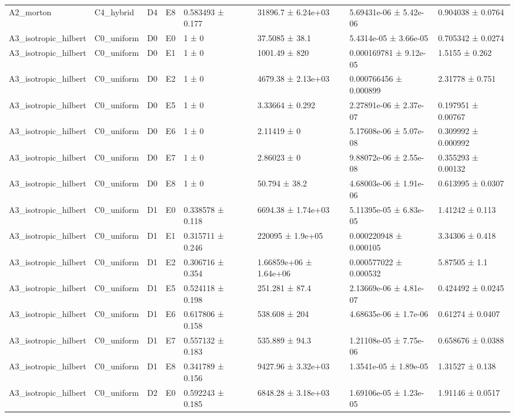 \begin{table}
\begin{tabular}{lllllllll}
A2\_morton & C4\_hybrid & D4 & E8 & 0.583493 ± 0.177 &  & 31896.7 ± 6.24e+03 & 5.69431e-06 ± 5.42e-06 & 0.904038 ± 0.0764 \\
A3\_isotropic\_hilbert & C0\_uniform & D0 & E0 & 1 ± 0 &  & 37.5085 ± 38.1 & 5.4314e-05 ± 3.66e-05 & 0.705342 ± 0.0274 \\
A3\_isotropic\_hilbert & C0\_uniform & D0 & E1 & 1 ± 0 &  & 1001.49 ± 820 & 0.000169781 ± 9.12e-05 & 1.5155 ± 0.262 \\
A3\_isotropic\_hilbert & C0\_uniform & D0 & E2 & 1 ± 0 &  & 4679.38 ± 2.13e+03 & 0.000766456 ± 0.000899 & 2.31778 ± 0.751 \\
A3\_isotropic\_hilbert & C0\_uniform & D0 & E5 & 1 ± 0 &  & 3.33664 ± 0.292 & 2.27891e-06 ± 2.37e-07 & 0.197951 ± 0.00767 \\
A3\_isotropic\_hilbert & C0\_uniform & D0 & E6 & 1 ± 0 &  & 2.11419 ± 0 & 5.17608e-06 ± 5.07e-08 & 0.309992 ± 0.000992 \\
A3\_isotropic\_hilbert & C0\_uniform & D0 & E7 & 1 ± 0 &  & 2.86023 ± 0 & 9.88072e-06 ± 2.55e-08 & 0.355293 ± 0.00132 \\
A3\_isotropic\_hilbert & C0\_uniform & D0 & E8 & 1 ± 0 &  & 50.794 ± 38.2 & 4.68003e-06 ± 1.91e-06 & 0.613995 ± 0.0307 \\
A3\_isotropic\_hilbert & C0\_uniform & D1 & E0 & 0.338578 ± 0.118 &  & 6694.38 ± 1.74e+03 & 5.11395e-05 ± 6.83e-05 & 1.41242 ± 0.113 \\
A3\_isotropic\_hilbert & C0\_uniform & D1 & E1 & 0.315711 ± 0.246 &  & 220095 ± 1.9e+05 & 0.000220948 ± 0.000105 & 3.34306 ± 0.418 \\
A3\_isotropic\_hilbert & C0\_uniform & D1 & E2 & 0.306716 ± 0.354 &  & 1.66859e+06 ± 1.64e+06 & 0.000577022 ± 0.000532 & 5.87505 ± 1.1 \\
A3\_isotropic\_hilbert & C0\_uniform & D1 & E5 & 0.524118 ± 0.198 &  & 251.281 ± 87.4 & 2.13669e-06 ± 4.81e-07 & 0.424492 ± 0.0245 \\
A3\_isotropic\_hilbert & C0\_uniform & D1 & E6 & 0.617806 ± 0.158 &  & 538.608 ± 204 & 4.68635e-06 ± 1.7e-06 & 0.61274 ± 0.0407 \\
A3\_isotropic\_hilbert & C0\_uniform & D1 & E7 & 0.557132 ± 0.183 &  & 535.889 ± 94.3 & 1.21108e-05 ± 7.75e-06 & 0.658676 ± 0.0388 \\
A3\_isotropic\_hilbert & C0\_uniform & D1 & E8 & 0.341789 ± 0.156 &  & 9427.96 ± 3.32e+03 & 1.3541e-05 ± 1.89e-05 & 1.31527 ± 0.138 \\
A3\_isotropic\_hilbert & C0\_uniform & D2 & E0 & 0.592243 ± 0.185 &  & 6848.28 ± 3.18e+03 & 1.69106e-05 ± 1.23e-05 & 1.91146 ± 0.0517 \\

\end{tabular}
\end{table}
